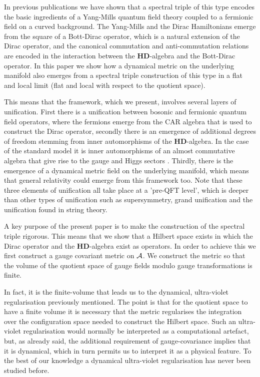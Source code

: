 \documentclass[letterpaper,11pt]{article}
\def\ca{{\cal A}}
\begin{document}
In previous publications \cite{Aastrup:2017atr,Aastrup:2019yui,Aastrup:2020jcf} we have shown that a spectral triple of this type encodes the basic ingredients of a Yang-Mills quantum field theory coupled to a fermionic field on a curved background. The Yang-Mills and the Dirac Hamiltonians emerge from the square of a Bott-Dirac operator, which is a natural extension of the Dirac operator, and the canonical commutation and anti-commutation relations are encoded in the interaction between the $\mathbf{HD}$-algebra and the Bott-Dirac operator. In this paper we show how a dynamical metric on the underlying manifold also emerges from a spectral triple construction of this type in a flat and local limit (flat and local with respect to the quotient space). 






 This means that the framework, which we present, involves several layers of unification. First there is a unification between bosonic and fermionic quantum field operators, where the fermions emerge from the CAR algebra that is used to construct the Dirac operator, secondly there is an emergence of additional degrees of freedom stemming from inner automorphisms of the $\mathbf{HD}$-algebra. In the case of the standard model it is inner automorphisms of an almost commutative algebra that give rise to the gauge and Higgs sectors \cite{Connes:2006qj,Chamseddine:1991qh,Chamseddine:2006ep}. Thirdly, there is the emergence of a dynamical metric field on the underlying manifold, which means that general relativity could emerge from this framework too.   
Note that these three elements of unification all take place at a 'pre-QFT level', which is deeper than other types of unification such as supersymmetry, grand unification and the unification found in string theory.



A key purpose of the present paper is to make  the construction of the  spectral triple rigorous. This means that we show that a Hilbert space exists in which the Dirac operator and the $\mathbf{HD}$-algebra exist as operators. In order to achieve this we first construct a gauge covariant metric on $\ca$. We construct the metric so that the volume of the quotient space of gauge fields modulo gauge transformations is finite. 

In fact, it is the finite-volume  that leads us to the dynamical, ultra-violet regularisation previously mentioned.
The point is that for the quotient space to have a finite volume it is necessary that the metric regularises the integration over the configuration space needed to construct the Hilbert space. Such an ultra-violet regularisation would normally be interpreted as a computational artefact, but, as already said, the additional requirement of gauge-covariance implies that it is dynamical, which in turn permits us to interpret it as a physical feature.
 To the best of our knowledge a dynamical ultra-violet regularisation has never been studied before.
\end{document}
